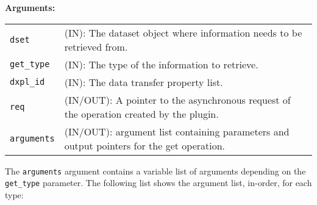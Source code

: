 \textbf{Arguments:}\\
\begin{tabular}{l p{10cm}}
  {\tt dset} & (IN): The dataset object where information needs to be
  retrieved from.\\
  {\tt get\_type} & (IN): The type of the information to retrieve.\\
  {\tt dxpl\_id} & (IN): The data transfer property list.\\
  {\tt req} & (IN/OUT): A pointer to the asynchronous request of the
  operation created by the plugin.\\
  {\tt arguments} & (IN/OUT): argument list containing parameters and
  output pointers for the get operation. \\
\end{tabular}

The {\tt arguments} argument contains a variable list of arguments
depending on the {\tt get\_type} parameter. The following list shows
the argument list, in-order, for each type:

